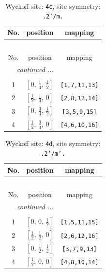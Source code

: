 \documentclass[fleqn,8pt]{jsarticle}
\begin{document}
\renewcommand{\arraystretch}{1.2}
\begin{longtable}{ccc}
\caption{Wyckoff site: {\tt 4c}, site symmetry: {\tt .2'/m.}}
 \\
 \hline \hline
No. & position & mapping \\ \hline \endfirsthead

\multicolumn{2}{l}{\tablename\ \thetable{}} \\
 \hline \hline
No. & position & mapping \\ \hline \endhead

 \hline \hline
\multicolumn{2}{r}{\footnotesize\it continued ...} \\ \endfoot

 \hline \hline
\multicolumn{2}{r}{} \\ \endlastfoot

1 & $\left[ 0,\, \frac{1}{4},\, \frac{1}{2} \right]$ & {\tt [1,7,11,13]} \\ \hline
2 & $\left[ \frac{1}{2},\, \frac{1}{4},\, 0 \right]$ & {\tt [2,8,12,14]} \\ \hline
3 & $\left[ 0,\, \frac{3}{4},\, \frac{1}{2} \right]$ & {\tt [3,5,9,15]} \\ \hline
4 & $\left[ \frac{1}{2},\, \frac{3}{4},\, 0 \right]$ & {\tt [4,6,10,16]} \\
\end{longtable}
\renewcommand{\arraystretch}{1.2}
\begin{longtable}{ccc}
\caption{Wyckoff site: {\tt 4d}, site symmetry: {\tt .2'/m'.}}
 \\
 \hline \hline
No. & position & mapping \\ \hline \endfirsthead

\multicolumn{2}{l}{\tablename\ \thetable{}} \\
 \hline \hline
No. & position & mapping \\ \hline \endhead

 \hline \hline
\multicolumn{2}{r}{\footnotesize\it continued ...} \\ \endfoot

 \hline \hline
\multicolumn{2}{r}{} \\ \endlastfoot

1 & $\left[ 0,\, 0,\, \frac{1}{2} \right]$ & {\tt [1,5,11,15]} \\ \hline
2 & $\left[ \frac{1}{2},\, \frac{1}{2},\, 0 \right]$ & {\tt [2,6,12,16]} \\ \hline
3 & $\left[ 0,\, \frac{1}{2},\, \frac{1}{2} \right]$ & {\tt [3,7,9,13]} \\ \hline
4 & $\left[ \frac{1}{2},\, 0,\, 0 \right]$ & {\tt [4,8,10,14]} \\
\end{longtable}
\end{document}
